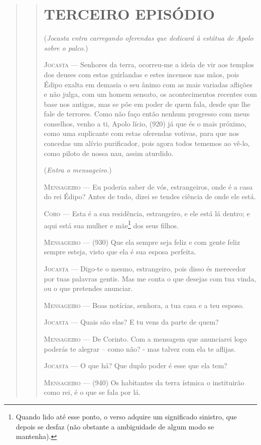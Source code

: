\begin{verse}
\begin{verse}
\section{TERCEIRO EPISÓDIO}

(\emph{Jocasta entra carregando oferendas que dedicará à estátua de
Apolo sobre o palco.})

\textsc{Jocasta} --- Senhores da terra, ocorreu-me a ideia de vir aos templos dos deuses com
estas guirlandas e estes incensos nas mãos, pois Édipo exalta em demasia
o seu ânimo com as mais variadas aflições e não julga, com um homem
sensato, os acontecimentos recentes com base nos antigos, mas se põe em
poder de quem fala, desde que lhe fale de terrores. Como não faço então
nenhum progresso com meus conselhos, venho a ti, Apolo lício, (920) já
que és o mais próximo, como uma suplicante com estas oferendas votivas,
para que nos concedas um alívio purificador, pois agora todos tememos ao
vê-lo, como piloto de nossa nau, assim aturdido.

(\emph{Entra o mensageiro.})

\textsc{Mensageiro} --- Eu poderia saber de vós, estrangeiros, onde é a casa do rei Édipo? Antes
de tudo, dizei se tendes ciência de onde ele está.

\textsc{Coro} --- Esta é a sua residência, estrangeiro, e ele está lá dentro; e aqui está
sua mulher e mãe\footnote{Quando lido até esse ponto, o verso adquire um
  significado sinistro, que depois se desfaz (não obstante a ambiguidade
  de algum modo se mantenha).} dos seus filhos.

\textsc{Mensageiro} --- (930) Que ela sempre seja feliz e com gente feliz sempre esteja, visto
que ela é sua esposa perfeita.

\textsc{Jocasta} --- Digo-te o mesmo, estrangeiro, pois disso és merecedor por tuas palavras
gentis. Mas me conta o que desejas com tua vinda, ou o que pretendes
anunciar.

\textsc{Mensageiro} --- Boas notícias, senhora, a tua casa e a teu esposo.

\textsc{Jocasta} --- Quais são elas? E tu vens da parte de quem?

\textsc{Mensageiro} --- De Corinto. Com a mensagem que anunciarei logo poderás te alegrar --
como não? - mas talvez com ela te aflijas.

\textsc{Jocasta} --- O que há? Que duplo poder é esse que ela tem?

\textsc{Mensageiro} --- (940) Os habitantes da terra ístmica o instituirão como rei, é o que se
fala por lá.


\end{verse}
\end{verse}
